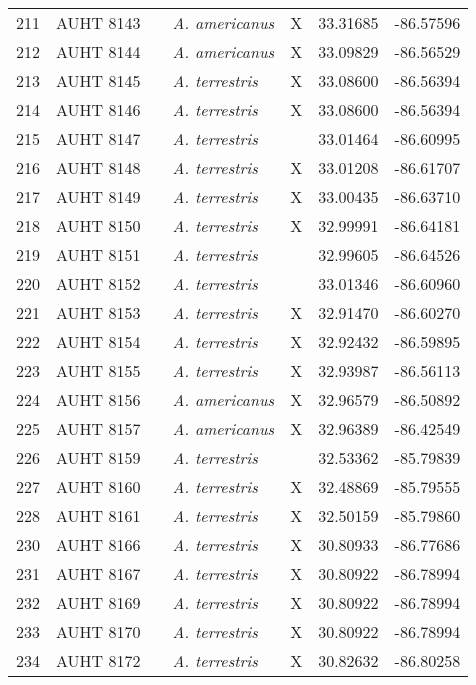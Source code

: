 \begin{longtable}{ lllllll }
211 & AUHT 8143 &  & \textit{A. americanus} & X & 33.31685 & -86.57596 \\ 
212 & AUHT 8144 &  & \textit{A. americanus} & X & 33.09829 & -86.56529 \\ 
213 & AUHT 8145 &  & \textit{A. terrestris} & X & 33.08600 & -86.56394 \\ 
214 & AUHT 8146 &  & \textit{A. terrestris} & X & 33.08600 & -86.56394 \\ 
215 & AUHT 8147 &  & \textit{A. terrestris} &  & 33.01464 & -86.60995 \\ 
216 & AUHT 8148 &  & \textit{A. terrestris} & X & 33.01208 & -86.61707 \\ 
217 & AUHT 8149 &  & \textit{A. terrestris} & X & 33.00435 & -86.63710 \\ 
218 & AUHT 8150 &  & \textit{A. terrestris} & X & 32.99991 & -86.64181 \\ 
219 & AUHT 8151 &  & \textit{A. terrestris} &  & 32.99605 & -86.64526 \\ 
220 & AUHT 8152 &  & \textit{A. terrestris} &  & 33.01346 & -86.60960 \\ 
221 & AUHT 8153 &  & \textit{A. terrestris} & X & 32.91470 & -86.60270 \\ 
222 & AUHT 8154 &  & \textit{A. terrestris} & X & 32.92432 & -86.59895 \\ 
223 & AUHT 8155 &  & \textit{A. terrestris} & X & 32.93987 & -86.56113 \\ 
224 & AUHT 8156 &  & \textit{A. americanus} & X & 32.96579 & -86.50892 \\ 
225 & AUHT 8157 &  & \textit{A. americanus} & X & 32.96389 & -86.42549 \\ 
226 & AUHT 8159 &  & \textit{A. terrestris} &  & 32.53362 & -85.79839 \\ 
227 & AUHT 8160 &  & \textit{A. terrestris} & X & 32.48869 & -85.79555 \\ 
228 & AUHT 8161 &  & \textit{A. terrestris} & X & 32.50159 & -85.79860 \\ 
230 & AUHT 8166 &  & \textit{A. terrestris} & X & 30.80933 & -86.77686 \\ 
231 & AUHT 8167 &  & \textit{A. terrestris} & X & 30.80922 & -86.78994 \\ 
232 & AUHT 8169 &  & \textit{A. terrestris} & X & 30.80922 & -86.78994 \\ 
233 & AUHT 8170 &  & \textit{A. terrestris} & X & 30.80922 & -86.78994 \\ 
234 & AUHT 8172 &  & \textit{A. terrestris} & X & 30.82632 & -86.80258 \\ 

\end{longtable}
